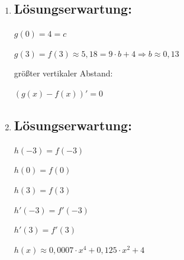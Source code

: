 \begin{langesbeispiel}
{\begin{enumerate}
	$\delta=f(3)-f(0)$
	
	$\delta=1,2$\,m\leer
	
	Die Seillänge beträgt ca. 6,6\,m.
	
	$\delta_1(8,6)\approx 2,8 \Rightarrow$ Der Durchhang nimmt um ca. 1,6\,m zu.

\item \subsection{Lösungserwartung:}
	
$g(0)=4=c$\leer

$g(3)=f(3)\approx 5,18=9\cdot b+4 \Rightarrow b\approx 0,13$\leer

größter vertikaler Abstand:

$(g(x)-f(x))'=0$

\item \subsection{Lösungserwartung:}
	
$h(-3)=f(-3)$

$h(0)=f(0)$

$h(3)=f(3)$

$h'(-3)=f'(-3)$

$h'(3)=f'(3)$\leer

$h(x)\approx 0,0007\cdot x^4+0,125\cdot x^2+4$

\end{enumerate}}
		\end{langesbeispiel}